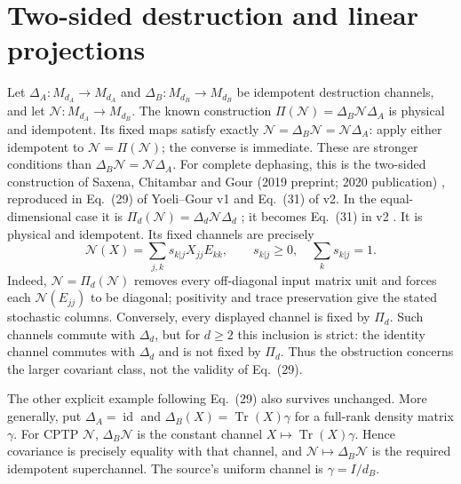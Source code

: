 \documentclass[11pt]{article}
\newcommand{\Tr}{\operatorname{Tr}}
\newcommand{\id}{\operatorname{id}}
\begin{document}
\section{Two-sided destruction and linear projections}
Let $\Delta_A:M_{d_A}\to M_{d_A}$ and
$\Delta_B:M_{d_B}\to M_{d_B}$ be idempotent destruction channels,
and let $\mathcal N:M_{d_A}\to M_{d_B}$.
The known
construction $\Pi(\mathcal N)=\Delta_B\mathcal N\Delta_A$
is physical and idempotent. Its fixed maps satisfy exactly
$\mathcal N=\Delta_B\mathcal N=\mathcal N\Delta_A$:
apply either idempotent to $\mathcal N=\Pi(\mathcal N)$; the converse is
immediate. These are stronger conditions than
$\Delta_B\mathcal N=\mathcal N\Delta_A$.
For complete dephasing, this is the two-sided construction of
Saxena, Chitambar and Gour (2019 preprint; 2020 publication)
\cite[Eq.~(4)]{SCG}, reproduced in
Eq.~(29) of Yoeli--Gour v1 and Eq.~(31) of v2.
In the equal-dimensional case it is
$\Pi_d(\mathcal N)=\Delta_d\mathcal N\Delta_d$
\cite[p.~4]{YG1}; it becomes Eq.~(31) in v2 \cite[p.~5]{YG2}.
It is physical and idempotent. Its fixed channels are precisely
\[
 \mathcal N(X)=\sum_{j,k}s_{k|j}X_{jj}E_{kk},
 \qquad s_{k|j}\geq0,\quad\sum_k s_{k|j}=1.
\]
Indeed, $\mathcal N=\Pi_d(\mathcal N)$ removes every off-diagonal input
matrix unit and forces each $\mathcal N(E_{jj})$ to be diagonal;
positivity and trace preservation give the stated stochastic columns.
Conversely, every displayed channel is fixed by $\Pi_d$.
Such channels commute with $\Delta_d$, but for $d\geq2$ this inclusion is
strict: the identity channel commutes with $\Delta_d$ and is not fixed
by $\Pi_d$. Thus the obstruction concerns the larger covariant class,
not the validity of Eq.~(29).

The other explicit example following Eq.~(29) also survives unchanged.
More generally, put $\Delta_A=\id$ and
$\Delta_B(X)=\Tr(X)\gamma$ for a full-rank density matrix $\gamma$.
For CPTP $\mathcal N$, $\Delta_B\mathcal N$ is the constant channel
$X\mapsto\Tr(X)\gamma$. Hence covariance is precisely equality with that
channel, and $\mathcal N\mapsto\Delta_B\mathcal N$ is the required
idempotent superchannel. The source's uniform channel is $\gamma=I/d_B$.
\end{document}
